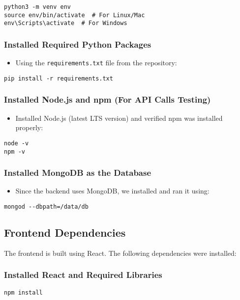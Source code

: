 \begin{verbatim}
python3 -m venv env
source env/bin/activate  # For Linux/Mac  
env\Scripts\activate  # For Windows  
\end{verbatim}

\subsubsection{Installed Required Python Packages}
\begin{itemize}
    \item Using the \texttt{requirements.txt} file from the repository:
\end{itemize}

\begin{verbatim}
pip install -r requirements.txt
\end{verbatim}

\subsubsection{Installed Node.js and npm (For API Calls Testing)}
\begin{itemize}
    \item Installed Node.js (latest LTS version) and verified npm was installed properly:
\end{itemize}

\begin{verbatim}
node -v
npm -v
\end{verbatim}

\subsubsection{Installed MongoDB as the Database}
\begin{itemize}
    \item Since the backend uses MongoDB, we installed and ran it using:
\end{itemize}

\begin{verbatim}
mongod --dbpath=/data/db
\end{verbatim}

\subsection{Frontend Dependencies}

The frontend is built using React. The following dependencies were installed:

\subsubsection*{Installed React and Required Libraries}
\begin{verbatim}
npm install
\end{verbatim}

